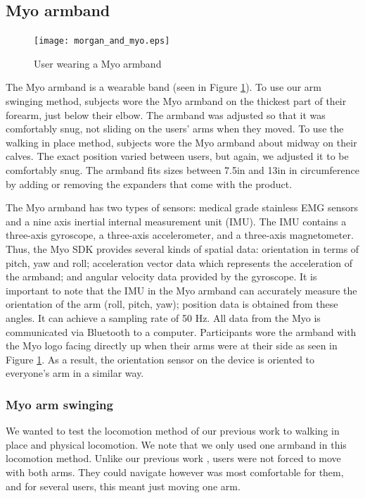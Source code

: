 \documentclass[titlepage]{article}
\theoremstyle{definition}
\theoremstyle{proof}
\begin{document}
\subsection{Myo armband}
\begin{figure}[h]
  \centering
  \texttt{[image: morgan\_and\_myo.eps]}
  \caption{User wearing a Myo armband}
  \label{fig:morgan}
\end{figure}
The Myo armband is a wearable band (seen in Figure \ref{fig:morgan}).
To use our arm swinging method, subjects wore the Myo armband on the thickest part of their forearm, just below their elbow.
The armband was adjusted so that it was comfortably snug, not sliding on the users' arms when they moved.
To use the walking in place method, subjects wore the Myo armband about midway on their calves.
The exact position varied between users, but again, we adjusted it to be comfortably snug.
The armband fits sizes between 7.5in and 13in in circumference
by adding or removing the expanders that come with the product.

The Myo armband has two types of sensors:
medical grade stainless EMG sensors
and a nine axis inertial internal measurement unit (IMU).
The IMU contains a three-axis gyroscope, a three-axis accelerometer, and a three-axis magnetometer.
Thus, the Myo SDK provides several kinds of spatial data:
orientation in terms of pitch, yaw and roll;
acceleration vector data which represents the acceleration of the armband;
and angular velocity data provided by the gyroscope.
It is important to note that the IMU in the Myo armband can accurately measure the orientation of the arm (roll, pitch, yaw);
position data is obtained from these angles.
It can achieve a sampling rate of 50 Hz.
All data from the Myo is communicated via Bluetooth to a computer.
Participants wore the armband
with the Myo logo facing directly up when their arms were
at their side as seen in Figure \ref{fig:morgan}.
As a result, the orientation sensor on the device is oriented to everyone’s arm in a similar way.





\subsubsection{Myo arm swinging}
We wanted to test the locomotion method of our previous work \cite{previousMYO}
to walking in place and physical locomotion.
We note that we only used one armband in this locomotion method.
Unlike our previous work \cite{previousMYO},
users were not forced to move with both arms.
They could navigate however was most comfortable for them,
and for several users, this meant just moving one arm.
\end{document}
